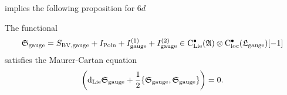 \documentclass[10pt, oneside]{article}
\begin{document}
 implies the following proposition for $6d$
\begin{prop}
The functional
\[
\mathfrak S_{\rm gauge} = S_{\rm BV, gauge} + I_{\rm Poin} + I_{\rm gauge}^{(1)} + I_{\rm gauge}^{(2)} \in {\rm C}_{\rm Lie}^\bullet(\mathfrak{A}) \otimes {\rm C}_{\rm loc}^\bullet(\mathfrak L_{\rm gauge}) [-1]
\]
satisfies the Maurer-Cartan equation
\[
\left({\rm d}_{\rm Lie} \mathfrak S_{\rm gauge} + \frac{1}{2} \{\mathfrak S_{\rm gauge}, \mathfrak S_{\rm gauge}\} \right) = 0 .
\]
\end{prop}
\end{document}
